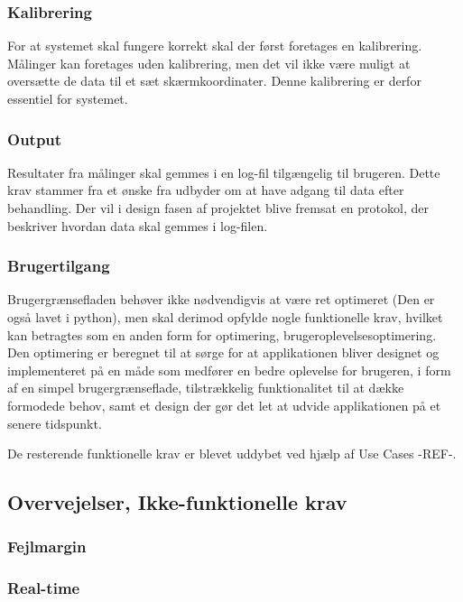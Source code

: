\documentclass[rapport.tex]{subfiles}
\begin{document}
	
	\subsubsection{Kalibrering}
	For at systemet skal fungere korrekt skal der først foretages en kalibrering.
	Målinger kan foretages uden kalibrering, men det vil ikke være muligt at oversætte de data til et sæt skærmkoordinater. Denne kalibrering er derfor essentiel for systemet.
	
	
	\subsubsection{Output}
	Resultater fra målinger skal gemmes i en log-fil tilgængelig til brugeren. Dette krav stammer fra et ønske fra udbyder om at have adgang til data efter behandling. Der vil i
	design fasen af projektet blive fremsat en protokol, der beskriver hvordan data skal gemmes i log-filen. 
	
	
	\subsubsection{Brugertilgang}
	Brugergrænsefladen behøver ikke nødvendigvis at være ret optimeret (Den er også lavet i python),
	men skal derimod opfylde nogle funktionelle krav, hvilket kan betragtes som en
	anden form for optimering, brugeroplevelsesoptimering. Den optimering er beregnet til at
	sørge for at applikationen bliver designet og implementeret på en måde som medfører en
	bedre oplevelse for brugeren, i form af en simpel brugergrænseflade, tilstrækkelig
	funktionalitet til at dække formodede behov, samt et design der gør det let at udvide
	applikationen på et senere tidspunkt.
	
	De resterende funktionelle krav er blevet uddybet ved hjælp af Use Cases -REF-.
	
	
	\subsection{Overvejelser, Ikke-funktionelle krav}
	
	\subsubsection{Fejlmargin}
	
	
	
	\subsubsection{Real-time}
	
\end{document}
